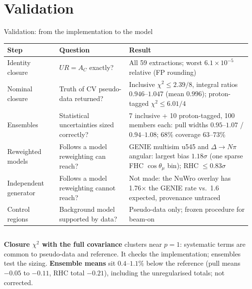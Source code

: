\documentclass[aspectratio=169,10pt]{beamer}
\begin{document}
\section{Validation}
\begin{frame}{Validation: from the implementation to the model}
  \scriptsize\centering\setlength{\tabcolsep}{3pt}
  \begin{tabular}{@{}p{2.6cm}p{4.3cm}p{6.8cm}@{}}
    \toprule
    Step & Question & Result \\\midrule
    Identity closure & $UR=A_C$ exactly? & All 59 extractions; worst $6.1\times10^{-5}$ relative (FP rounding) \\
    Nominal closure & Truth of CV pseudo-data returned? & Inclusive $\chi^2\le2.39/8$, integral ratios $0.946$--$1.047$ (mean $0.996$); proton-tagged $\chi^2\le6.01/4$ \\
    Ensembles & Statistical uncertainties sized correctly? & 7 inclusive + 10 proton-tagged, 100 members each: pull widths $0.95$--$1.07$ / $0.94$--$1.08$; $68\%$ coverage $63$--$73\%$ \\
    Reweighted models & Follows a model reweighting can reach? & GENIE multisim u545 and $\Delta\to N\pi$ angular: largest bias $1.18\sigma$ (one sparse FHC $\cos\theta_\mu$ bin); RHC $\le0.83\sigma$ \\
    Independent generator & Follows a model reweighting cannot reach? & Not made: the NuWro overlay has 1.76$\times$ the GENIE rate vs.\ 1.6 expected, provenance untraced \\
    Control regions & Background model supported by data? & Pseudo-data only; frozen procedure for beam-on \\
    \bottomrule
  \end{tabular}
  \vspace{3mm}
  \begin{columns}[T]
  \scriptsize
  \textbf{Closure $\chi^2$ with the full covariance} clusters near $p=1$: systematic terms are common to
  pseudo-data and reference. It checks the implementation; ensembles test the sizing.
  \scriptsize
  \textbf{Ensemble means} sit $0.4$--$1.1\%$ below the reference (pull means $-0.05$ to $-0.11$, RHC total $-0.21$),
  including the unregularised totals; not corrected.
  \end{columns}
\end{frame}
\end{document}
